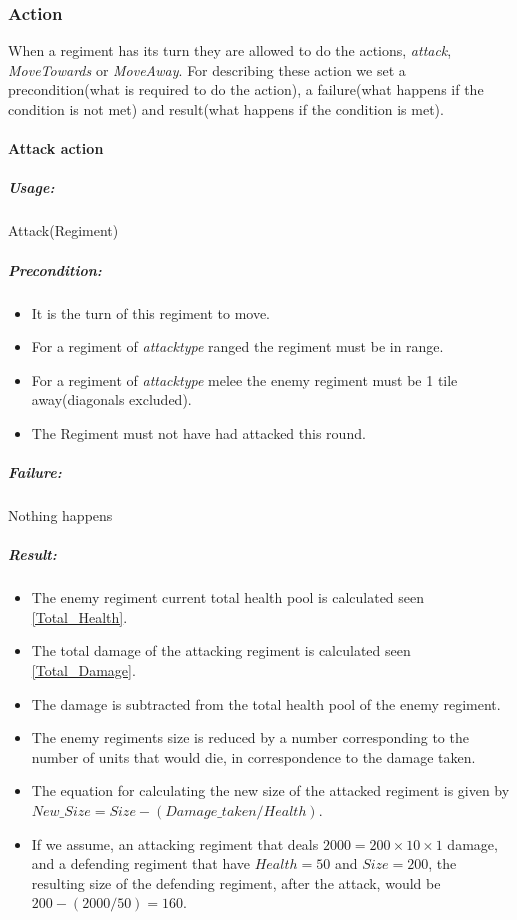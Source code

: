 		\subsubsection{Action}
		\label{rules:action}
		When a regiment has its turn they are allowed to do the actions, \textit{attack}, \textit{MoveTowards} or \textit{MoveAway}.
		For describing these action we set a precondition(what is required to do the action), a failure(what happens if the condition is not met)
		and result(what happens if the condition is met).
		
		\paragraph{Attack action}
		\subparagraph{Usage:} 
		Attack(Regiment)
		
		\subparagraph{Precondition:} 
		\begin{itemize}\itemsep0.0001cm
		\item It is the turn of this regiment to move.
		\item For a regiment of \textit{attacktype} ranged the regiment must be in range. 
		\item For a regiment of \textit{attacktype} melee the enemy regiment must be 1 tile away(diagonals excluded).
		\item The Regiment must not have had attacked this round.
		\end{itemize}
		\subparagraph{Failure:} 
		Nothing happens
		
		\subparagraph{Result:}
		\begin{itemize} 
		\item The enemy regiment current total health pool is calculated seen \ref{Total_Health}.
		\item The total damage of the attacking regiment is calculated seen \ref{Total_Damage}.
		\item The damage is subtracted from the total health pool of the enemy regiment.
		\item The enemy regiments size is reduced by a number corresponding to the number of units that would die, in correspondence to the damage taken.
		\item The equation for calculating the new size of the attacked regiment is given by 
		\subitem \label{New_Size}$New\_Size = Size - (Damage\_taken / Health)$.
		\item If we assume, an attacking regiment that deals $2000 = 200 \times 10 \times 1$ damage, and a defending regiment that have $Health = 50$ and $Size = 200$, the resulting size of the defending regiment, after the attack, would be $200-(2000/50)=160$.
		\end{itemize}
